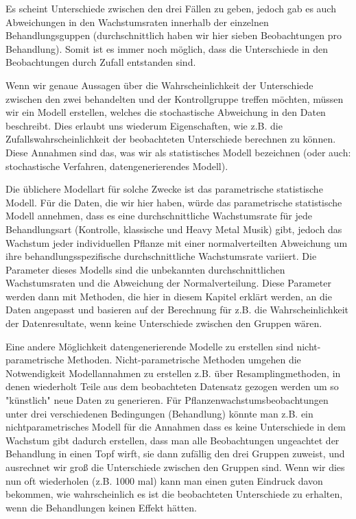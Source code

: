 \documentclass[a4paper,twoside]{tufte-book}\usepackage[]{graphicx}\usepackage[]{color}
\begin{document}
Es scheint Unterschiede zwischen den drei Fällen zu geben, jedoch gab es auch Abweichungen in den Wachstumsraten innerhalb der einzelnen Behandlungsguppen (durchschnittlich haben wir hier sieben Beobachtungen pro Behandlung). Somit ist es immer noch möglich, dass die Unterschiede in den Beobachtungen durch Zufall entstanden sind.

Wenn wir genaue Aussagen über die Wahrscheinlichkeit der Unterschiede zwischen den zwei behandelten und der Kontrollgruppe treffen möchten, müssen wir ein Modell erstellen, welches die stochastische Abweichung in den Daten beschreibt. Dies erlaubt uns wiederum Eigenschaften, wie z.B. die Zufallswahrscheinlichkeit der beobachteten Unterschiede berechnen zu können. Diese Annahmen sind das, was wir als statistisches Modell bezeichnen (oder auch: stochastische Verfahren, datengenerierendes Modell). 

Die üblichere Modellart für solche Zwecke ist das parametrische statistische Modell. Für die Daten, die wir hier haben, würde das parametrische statistische Modell annehmen, dass es eine durchschnittliche Wachstumsrate für jede Behandlungsart (Kontrolle, klassische und Heavy Metal Musik) gibt, jedoch das Wachstum jeder individuellen Pflanze mit einer normalverteilten Abweichung um ihre behandlungsspezifische durchschnittliche Wachstumsrate variiert. Die Parameter dieses Modells sind die unbekannten durchschnittlichen Wachstumsraten und die Abweichung der Normalverteilung. Diese Parameter werden dann mit Methoden, die hier in diesem Kapitel erklärt werden, an die Daten angepasst und basieren auf der Berechnung für z.B. die Wahrscheinlichkeit der Datenresultate, wenn keine Unterschiede zwischen den Gruppen wären.

Eine andere Möglichkeit datengenerierende Modelle zu erstellen sind nicht-parametrische Methoden. Nicht-parametrische Methoden umgehen die Notwendigkeit Modellannahmen zu erstellen z.B. über Resamplingmethoden, in denen wiederholt Teile aus dem beobachteten Datensatz gezogen werden um so "künstlich" neue Daten zu generieren. Für Pflanzenwachstumsbeobachtungen unter drei verschiedenen Bedingungen (Behandlung) könnte man z.B. ein nichtparametrisches Modell für die Annahmen dass es keine Unterschiede in dem Wachstum gibt dadurch erstellen, dass man alle Beobachtungen ungeachtet der Behandlung in einen Topf wirft, sie dann zufällig den drei Gruppen zuweist, und ausrechnet wir groß die Unterschiede zwischen den Gruppen sind. Wenn wir dies nun oft wiederholen (z.B. 1000 mal) kann man einen guten Eindruck davon bekommen, wie wahrscheinlich es ist die beobachteten Unterschiede zu erhalten, wenn die Behandlungen keinen Effekt hätten.
\end{document}
